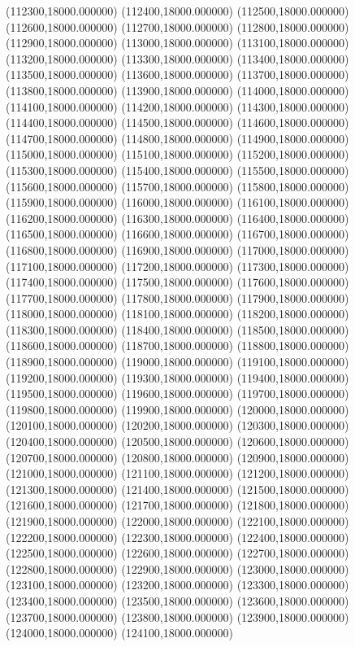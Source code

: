(112300,18000.000000)
(112400,18000.000000)
(112500,18000.000000)
(112600,18000.000000)
(112700,18000.000000)
(112800,18000.000000)
(112900,18000.000000)
(113000,18000.000000)
(113100,18000.000000)
(113200,18000.000000)
(113300,18000.000000)
(113400,18000.000000)
(113500,18000.000000)
(113600,18000.000000)
(113700,18000.000000)
(113800,18000.000000)
(113900,18000.000000)
(114000,18000.000000)
(114100,18000.000000)
(114200,18000.000000)
(114300,18000.000000)
(114400,18000.000000)
(114500,18000.000000)
(114600,18000.000000)
(114700,18000.000000)
(114800,18000.000000)
(114900,18000.000000)
(115000,18000.000000)
(115100,18000.000000)
(115200,18000.000000)
(115300,18000.000000)
(115400,18000.000000)
(115500,18000.000000)
(115600,18000.000000)
(115700,18000.000000)
(115800,18000.000000)
(115900,18000.000000)
(116000,18000.000000)
(116100,18000.000000)
(116200,18000.000000)
(116300,18000.000000)
(116400,18000.000000)
(116500,18000.000000)
(116600,18000.000000)
(116700,18000.000000)
(116800,18000.000000)
(116900,18000.000000)
(117000,18000.000000)
(117100,18000.000000)
(117200,18000.000000)
(117300,18000.000000)
(117400,18000.000000)
(117500,18000.000000)
(117600,18000.000000)
(117700,18000.000000)
(117800,18000.000000)
(117900,18000.000000)
(118000,18000.000000)
(118100,18000.000000)
(118200,18000.000000)
(118300,18000.000000)
(118400,18000.000000)
(118500,18000.000000)
(118600,18000.000000)
(118700,18000.000000)
(118800,18000.000000)
(118900,18000.000000)
(119000,18000.000000)
(119100,18000.000000)
(119200,18000.000000)
(119300,18000.000000)
(119400,18000.000000)
(119500,18000.000000)
(119600,18000.000000)
(119700,18000.000000)
(119800,18000.000000)
(119900,18000.000000)
(120000,18000.000000)
(120100,18000.000000)
(120200,18000.000000)
(120300,18000.000000)
(120400,18000.000000)
(120500,18000.000000)
(120600,18000.000000)
(120700,18000.000000)
(120800,18000.000000)
(120900,18000.000000)
(121000,18000.000000)
(121100,18000.000000)
(121200,18000.000000)
(121300,18000.000000)
(121400,18000.000000)
(121500,18000.000000)
(121600,18000.000000)
(121700,18000.000000)
(121800,18000.000000)
(121900,18000.000000)
(122000,18000.000000)
(122100,18000.000000)
(122200,18000.000000)
(122300,18000.000000)
(122400,18000.000000)
(122500,18000.000000)
(122600,18000.000000)
(122700,18000.000000)
(122800,18000.000000)
(122900,18000.000000)
(123000,18000.000000)
(123100,18000.000000)
(123200,18000.000000)
(123300,18000.000000)
(123400,18000.000000)
(123500,18000.000000)
(123600,18000.000000)
(123700,18000.000000)
(123800,18000.000000)
(123900,18000.000000)
(124000,18000.000000)
(124100,18000.000000)
